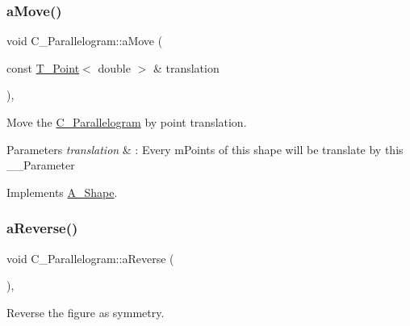\mbox{\label{classC__Parallelogram_ac77ea776b24c551114d84eaf147f6977}} 
\subsubsection{\texorpdfstring{a\+Move()}{aMove()}}
{\footnotesize\ttfamily void C\+\_\+\+Parallelogram\+::a\+Move (\begin{DoxyParamCaption}\item[{const \hyperlink{classT__Point}{T\+\_\+\+Point}$<$ double $>$ \&}]{translation }\end{DoxyParamCaption})\hspace{0.3cm}{\ttfamily [override]}, {\ttfamily [virtual]}}



Move the \hyperlink{classC__Parallelogram}{C\+\_\+\+Parallelogram} by point translation. 


\begin{DoxyParams}{Parameters}
{\em translation} & \+: Every m\+Points of this shape will be translate by this \+\_\+\+\_\+\+Parameter \\
\hline
\end{DoxyParams}


Implements \hyperlink{classA__Shape_ab284298db1b557ccfa7ba6de7a5fee2c}{A\+\_\+\+Shape}.

\mbox{\label{classC__Parallelogram_a573447294989d53fadf3d7adfb0640c6}} 
\subsubsection{\texorpdfstring{a\+Reverse()}{aReverse()}}
{\footnotesize\ttfamily void C\+\_\+\+Parallelogram\+::a\+Reverse (\begin{DoxyParamCaption}{ }\end{DoxyParamCaption})\hspace{0.3cm}{\ttfamily [override]}, {\ttfamily [virtual]}}



Reverse the figure as symmetry. 



